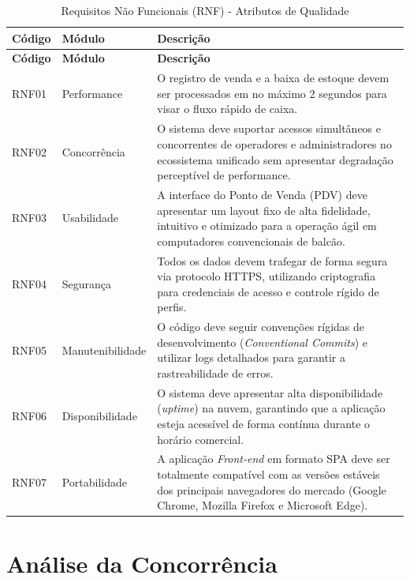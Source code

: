 \documentclass[
	12pt,				%
	openany,			%
	oneside,			%
	a4paper,			%
	english,			%
	french,				%
	spanish,			%
	brazil				%
	]{abntex2}
\begin{document}
\begin{longtable}{|>{\centering\arraybackslash}m{1.5cm}|>{\centering\arraybackslash}m{3cm}|>{\raggedright\arraybackslash}m{10.5cm}|}
    \caption{Requisitos Não Funcionais (RNF) - Atributos de Qualidade}
    \label{tab:requisitos_rnf}\\
    \hline
    \textbf{Código} & \textbf{Módulo} & \textbf{Descrição} \\ 
    \hline
    \endfirsthead
    \hline
    \textbf{Código} & \textbf{Módulo} & \textbf{Descrição} \\ 
    \hline
    \endhead
    \hline
    RNF01 & Performance & O registro de venda e a baixa de estoque devem ser processados em no máximo 2 segundos para visar o fluxo rápido de caixa. \\ 
    \hline
    RNF02 & Concorrência & O sistema deve suportar acessos simultâneos e concorrentes de operadores e administradores no ecossistema unificado sem apresentar degradação perceptível de performance. \\ 
    \hline
    RNF03 & Usabilidade & A interface do Ponto de Venda (PDV) deve apresentar um layout fixo de alta fidelidade, intuitivo e otimizado para a operação ágil em computadores convencionais de balcão. \\ 
    \hline
    RNF04 & Segurança & Todos os dados devem trafegar de forma segura via protocolo HTTPS, utilizando criptografia para credenciais de acesso e controle rígido de perfis. \\ 
    \hline
    RNF05 & Manutenibilidade & O código deve seguir convenções rígidas de desenvolvimento (\textit{Conventional Commits}) e utilizar logs detalhados para garantir a rastreabilidade de erros. \\ 
    \hline
    RNF06 & Disponibilidade & O sistema deve apresentar alta disponibilidade (\textit{uptime}) na nuvem, garantindo que a aplicação esteja acessível de forma contínua durante o horário comercial. \\ 
    \hline
    RNF07 & Portabilidade & A aplicação \textit{Front-end} em formato SPA deve ser totalmente compatível com as versões estáveis dos principais navegadores do mercado (Google Chrome, Mozilla Firefox e Microsoft Edge). \\ 
    \hline
\end{longtable}
\section{Análise da Concorrência}
\end{document}
